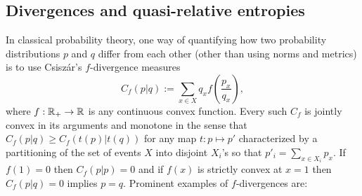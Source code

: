 \documentclass[11pt,a4paper]{article}
\theoremstyle{plain}
\theoremstyle{definition}
\theoremstyle{remark}
\begin{document}
\subsection{Divergences and quasi-relative entropies}

In classical probability theory, one way of quantifying how two probability distributions $p$ and $q$ differ from each other (other than using norms and metrics)
is to use Csisz\'ar's $f$-divergence measures
\begin{equation}\tag{8.26}
    C_f(p|q) := \sum_{x\in X} q_x f\!\left(\frac{p_x}{q_x}\right),
\end{equation}
where $f:\mathbb{R}_+\to\mathbb{R}$ is any continuous convex function. Every such $C_f$ is jointly convex in its arguments and monotone in the sense that
$C_f(p|q)\ge C_f(t(p)|t(q))$ for any map $t:p\mapsto p'$ characterized by a partitioning of the set of events $X$ into disjoint $X_i$'s so that
$p'_i=\sum_{x\in X_i} p_x$. If $f(1)=0$ then $C_f(p|p)=0$ and if $f(x)$ is strictly convex at $x=1$ then $C_f(p|q)=0$ implies $p=q$.
Prominent examples of $f$-divergences are:
\end{document}
